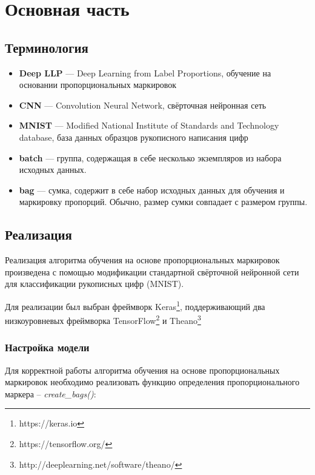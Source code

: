 \documentclass[12pt,a4paper]{article}
\begin{document}
\section{Основная часть}

\subsection{Терминология}

\begin{itemize}
\item \textbf{Deep LLP} --- Deep Learning from Label Proportions, обучение на
  основании пропорциональных маркировок
\item \textbf{CNN} --- Convolution Neural Network, свёрточная нейронная сеть
\item \textbf{MNIST} --- Modified National Institute of Standards and
  Technology database, база данных образцов рукописного написания цифр
\item \textbf{batch} --- группа, содержащая в себе несколько
  экземпляров из набора исходных данных. 
\item \textbf{bag} --- сумка, содержит в себе набор исходных данных
  для обучения и маркировку пропорций. Обычно, размер сумки совпадает
  с размером группы.
\end{itemize}

\subsection{Реализация}

Реализация алгоритма обучения на основе пропорциональных маркировок
произведена с помощью модификации стандартной свёрточной нейронной
сети для классификации рукописных цифр (MNIST).

Для реализации был выбран фреймворк Keras\footnote{https://keras.io},
поддерживающий два низкоуровневых фреймворка
TensorFlow\footnote{https://tensorflow.org/} и
Theano\footnote{http://deeplearning.net/software/theano/}

\newpage
\subsubsection{Настройка модели}

Для корректной работы алгоритма обучения на основе пропорциональных
маркировок необходимо реализовать функцию определения
пропорционального маркера -- \textit{create\_bags()}:
\end{document}
